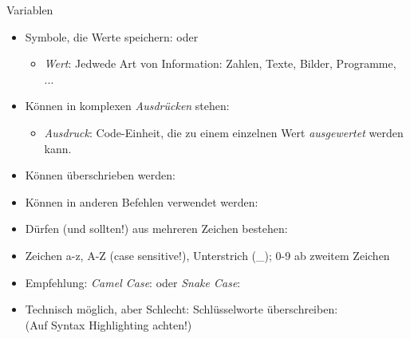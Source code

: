 \begin{frame}{Variablen}
%
\begin{itemize}
\item Symbole, die Werte speichern:  oder 
	\begin{itemize}
	\item \emph{Wert}: Jedwede Art von Information: Zahlen, Texte, Bilder, Programme, ...
	\end{itemize}
\item Können in komplexen \emph{Ausdrücken} stehen: 
	\begin{itemize}
	\item \emph{Ausdruck}: Code-Einheit, die zu einem einzelnen Wert \emph{ausgewertet} werden kann.
	\end{itemize}
\item Können überschrieben werden: 
\item Können in anderen Befehlen verwendet werden: 
\item Dürfen (und sollten!) aus mehreren Zeichen bestehen: 
\item Zeichen a-z, A-Z (case sensitive!), Unterstrich (\_); 0-9 ab zweitem Zeichen
\item Empfehlung: \emph{Camel Case}:  oder \emph{Snake Case}: 
\item Technisch möglich, aber Schlecht: Schlüsselworte überschreiben: \\
	(Auf Syntax Highlighting achten!)
\end{itemize}
%
\end{frame}


